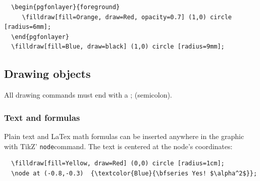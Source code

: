 \documentclass[10pt,letterpaper,twoside,notitlepage]{article}
\numberwithin{figure}{section}
\begin{document}
\noindent
\begin{minipage}{0.83\linewidth}
\brocol\begin{verbatim}
  \begin{pgfonlayer}{foreground}
     \filldraw[fill=Orange, draw=Red, opacity=0.7] (1,0) circle [radius=6mm];
  \end{pgfonlayer}
  \filldraw[fill=Blue, draw=black] (1,0) circle [radius=9mm];
\end{verbatim}\txcol
\end{minipage}
%
\begin{minipage}{0.16\linewidth}
\end{minipage}
%
\subsection{Drawing objects}
\label{Apx_tikzbasics_drawing}
%
\noindent
All drawing commands must end with a \;;\; (semicolon).
%
\subsubsection{Text and formulas}
%
\noindent
Plain text and LaTex math formulas can be inserted anywhere 
in the graphic with TikZ' \brocol\verb$node$\txcol command.
The text is centered at the node's coordinates:\\

\noindent
\begin{minipage}{0.83\linewidth}
\brocol\begin{verbatim}
  \filldraw[fill=Yellow, draw=Red] (0,0) circle [radius=1cm];
  \node at (-0.8,-0.3)  {\textcolor{Blue}{\bfseries Yes! $\alpha^2$}};
\end{verbatim}\txcol
\end{minipage}
%
\begin{minipage}{0.16\linewidth}
\end{minipage}
%
%
\end{document}
